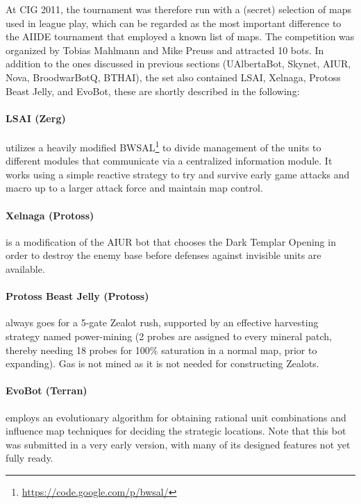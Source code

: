 \documentclass[journal]{IEEEtran}
\begin{document}
At CIG 2011, the tournament was therefore run with a (secret) selection
of maps used in league play, which can be regarded as the most important
difference to the AIIDE tournament that employed a known list of maps.
The competition was organized by Tobias Mahlmann and Mike
Preuss and attracted 10 bots. In addition to the ones discussed in previous
sections (UAlbertaBot, Skynet, AIUR, Nova, BroodwarBotQ, BTHAI), 
the set also contained LSAI, Xelnaga, Protoss Beast Jelly, and EvoBot,
these are shortly described in the following:

\paragraph*{LSAI (Zerg)} utilizes a heavily modified BWSAL\footnote{\url{https://code.google.com/p/bwsal/}} to divide management
 of the units to different modules that communicate via a centralized information
 module. It works using a simple reactive strategy to try and survive early game
 attacks and macro up to a larger attack force and maintain map control.
 
\paragraph*{Xelnaga (Protoss)} is a modification of the AIUR bot that chooses the 
Dark Templar Opening in order to destroy the enemy base before defenses against
invisible units are available. 

\paragraph*{Protoss Beast Jelly (Protoss)}
always goes for a 5-gate Zealot rush, supported by an effective harvesting 
strategy named power-mining (2 probes are assigned to every mineral patch,
thereby needing 18 probes for 100\% saturation in a normal map, prior
to expanding). Gas is not mined as it is not needed for constructing Zealots.

\paragraph*{EvoBot (Terran)} employs an evolutionary algorithm for obtaining rational
 unit combinations and influence map techniques for deciding the strategic locations. Note
 that this bot was submitted in a very early version, with many of its designed features not
 yet fully ready. 
\end{document}
